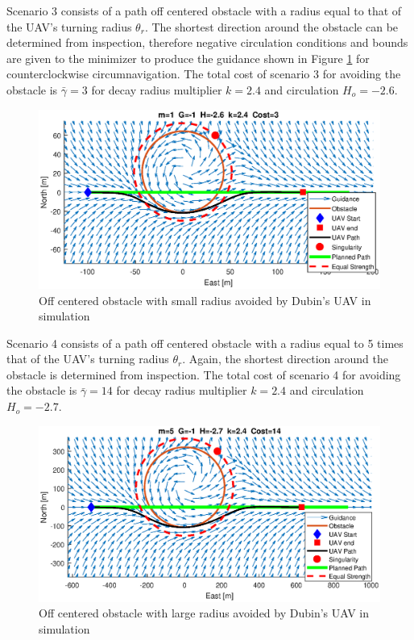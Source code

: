 \documentclass[numbered,pdftex]{ohio-etd}
\begin{document}
Scenario 3 consists of a path off centered obstacle with a radius equal to that of the UAV's turning radius $\theta_r$. The shortest direction around the obstacle can be determined from inspection, therefore negative circulation conditions and bounds are given to the minimizer to produce the guidance shown in Figure \ref{fig:m1y05} for counterclockwise circumnavigation. The total cost of scenario 3 for avoiding the obstacle is $\bar{\gamma}=3$ for decay radius multiplier $k=2.4$ and circulation $H_o = -2.6$.



\begin{figure}[H]
	\centering
	\includegraphics[trim = 0 85 0 85, clip, width=16cm]{Figures/results/m1Y05}
	\caption{Off centered obstacle with small radius avoided by Dubin's UAV in simulation}
	\label{fig:m1y05}
\end{figure}

Scenario 4 consists of a path off centered obstacle with a radius equal to 5 times that of the UAV's turning radius $\theta_r$. Again, the shortest direction around the obstacle is determined from inspection. The total cost of scenario 4 for avoiding the obstacle is $\bar{\gamma}=14$ for decay radius multiplier $k=2.4$ and circulation $H_o = -2.7$.


\begin{figure}[H]
	\centering
	\includegraphics[trim = 0 85 0 85, clip, width=16cm]{Figures/results/m5Y05}
	\caption{Off centered obstacle with large radius avoided by Dubin's UAV in simulation}
	\label{fig:m5y05}
\end{figure}
\end{document}
